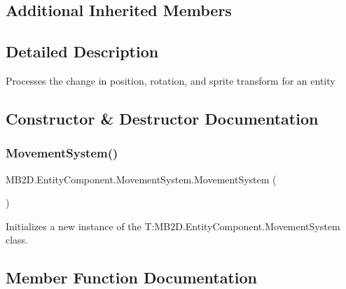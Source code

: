 \subsection*{Additional Inherited Members}


\subsection{Detailed Description}
Processes the change in position, rotation, and sprite transform for an entity 



\subsection{Constructor \& Destructor Documentation}
\hypertarget{class_m_b2_d_1_1_entity_component_1_1_movement_system_a64ad47c34d25ff6a9df2d2d841fc7cfb}{}\label{class_m_b2_d_1_1_entity_component_1_1_movement_system_a64ad47c34d25ff6a9df2d2d841fc7cfb} 
\subsubsection{\texorpdfstring{Movement\+System()}{MovementSystem()}}
{\footnotesize\ttfamily M\+B2\+D.\+Entity\+Component.\+Movement\+System.\+Movement\+System (\begin{DoxyParamCaption}{ }\end{DoxyParamCaption})\hspace{0.3cm}{\ttfamily [inline]}}



Initializes a new instance of the T\+:\+M\+B2\+D.\+Entity\+Component.\+Movement\+System class. 



\subsection{Member Function Documentation}
\hypertarget{class_m_b2_d_1_1_entity_component_1_1_movement_system_afa730fd9080848ce877206c00a744cdf}{}\label{class_m_b2_d_1_1_entity_component_1_1_movement_system_afa730fd9080848ce877206c00a744cdf} 
